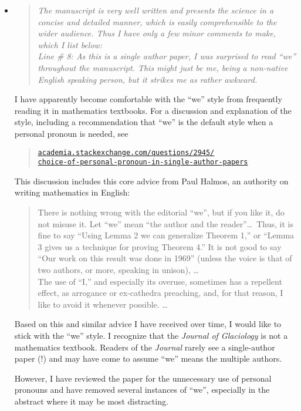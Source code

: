 \documentclass[11pt,reqno]{amsart}
\newcommand{\reply}[2]{
\medskip\medskip
\item  \begin{quote}
\emph{#1}
\end{quote}

\medskip
\noindent #2}
\begin{document}
\begin{itemize}
\reply{The manuscript is very well written and presents the science in a concise and detailed manner, which is easily comprehensible to the wider audience.  Thus I have only a few minor comments to make, which I list below:
\medskip \\
Line \# 8: As this is a single author paper, I was surprised to read ``we'' throughout the manuscript. This might just be me, being a non-native English speaking person, but it strikes me as rather awkward.}
{I have apparently become comfortable with the ``we'' style from frequently reading it in mathematics textbooks.  For a discussion and explanation of the style, including a recommendation that ``we'' is the default style when a personal pronoun is needed, see\begin{quote}
\href{http://academia.stackexchange.com/questions/2945/choice-of-personal-pronoun-in-single-author-papers}{\texttt{academia.stackexchange.com/questions/2945/\\ \phantom{foobar} choice-of-personal-pronoun-in-single-author-papers}}
\end{quote}
This discussion includes this core advice from Paul Halmos, an authority on writing mathematics in English: \begin{quote} \medskip
There is nothing wrong with the editorial ``we'', but if you like it, do not misuse it.  Let ``we'' mean ``the author and the reader''\dots  \, Thus, it is fine to say ``Using Lemma 2 we can generalize Theorem 1,'' or ``Lemma 3 gives us a technique for proving Theorem 4.''  It is not good to say ``Our work on this result was done in 1969'' (unless the voice is that of two authors, or more, speaking in unison), \dots \medskip \\
\indent The use of ``I,'' and especially its overuse, sometimes has a repellent effect, as arrogance or ex-cathedra preaching, and, for that reason, I like to avoid it whenever possible. \dots \medskip
\end{quote}
Based on this and similar advice I have received over time, I would like to stick with the ``we'' style.  I recognize that the \emph{Journal of Glaciology} is not a mathematics textbook.  Readers of the \emph{Journal} rarely see a single-author paper (!) and may have come to assume ``we'' means the multiple authors.

However, I have reviewed the paper for the unnecessary use of personal pronouns and have removed several instances of ``we'', especially in the abstract where it may be most distracting.}


\end{itemize}
\end{document}
